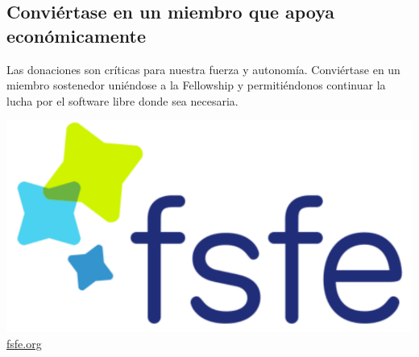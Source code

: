 \documentclass[10pt,foldmark,tumble]{leaflet}
\begin{document}
\subsection{Conviértase en un miembro que apoya económicamente}

    Las donaciones son críticas para nuestra fuerza y autonomía. Conviértase en un miembro sostenedor uniéndose a la Fellowship y permitiéndonos continuar la lucha por el software libre donde sea necesaria.
    
\vspace{15em}


\centering \includegraphics[scale=0.45]{logo.pdf} \\
\centering \Huge \url{fsfe.org}
\end{document}
